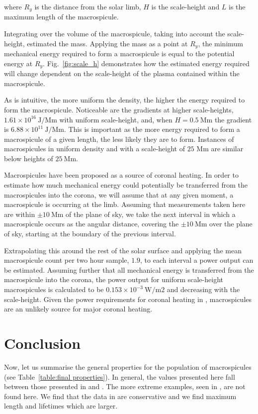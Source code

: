 \noindent where $R_y$ is the distance from the solar limb, $H$ is the scale-height and $L$ is the maximum length of the macrospicule.

Integrating over the volume of the macrospicule, taking into account the scale-height, estimated the mass. Applying the mass as a point at $R_y$, the minimum mechanical energy required to form a macrospicule is equal to the potential energy at $R_y$. Fig.~\ref{fig:scale_h} demonstrates how the estimated energy required will change dependent on the scale-height of the plasma contained within the macrospicule.

As is intuitive, the more uniform the density, the higher the energy required to form the macrospicule. Noticeable are the gradients at higher scale-heights, $1.61 \times 10^{16}\ \textrm{J/Mm}$ with uniform scale-height, and, when $H = 0.5\ \textrm{Mm}$ the gradient is  $6.88 \times 10^{11}\ \textrm{J/Mm}$. This is important as the more energy required to form a macrospicule of a given length, the less likely they are to form. Instances of macrospicules in uniform density and with a scale-height of $25$ Mm are similar below heights of $25\ \textrm{Mm}$.

Macrospicules have been proposed as a source of coronal heating. In order to estimate how much mechanical energy could potentially be transferred from the macrospicules into the corona, we will assume that at any given moment, a macrospicule is occurring at the limb. Assuming that measurements taken here are within $\pm10\ \textrm{Mm}$ of the plane of sky, we take the next interval in which a macrospicule occurs as the angular distance, covering the $\pm10\ \textrm{Mm}$ over the plane of sky, starting at the boundary of the previous interval. 

Extrapolating this around the rest of the solar surface and applying the mean macrospicule count per two hour sample, $1.9$, to each interval a power output can be estimated. Assuming further that all mechanical energy is transferred from the macrospicule into the corona, the power output for uniform scale-height macrospicules is calculated to be $0.153 \times 10^{-3}\ \textrm{W/m{2}}$ and decreasing with the scale-height. Given the power requirements for coronal heating in \cite{AschwandenCHR2007}, macrospicules are an unlikely source for major coronal heating.


\section{Conclusion}
Now, let us summarise the general properties for the population of macrospicules (see Table~\ref{table:final properties}). In general, the values presented here fall between those presented in \cite{Bohlin1975} and \cite{Dere89}. The more extreme examples, seen in \cite{Bohlin1975}, are not found here. We find that the data in \cite{Dere89} are conservative and we find maximum length and lifetimes which are larger. 

